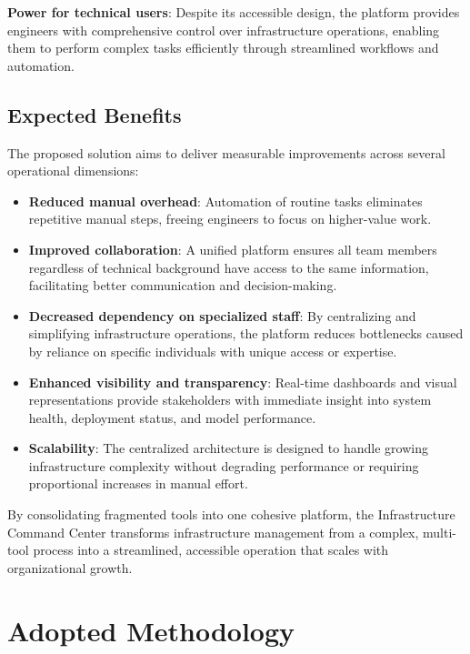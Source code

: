 \textbf{Power for technical users}: Despite its accessible design, the platform provides engineers with comprehensive control over infrastructure operations, enabling them to perform complex tasks efficiently through streamlined workflows and automation.

\subsection{Expected Benefits}

The proposed solution aims to deliver measurable improvements across several operational dimensions:

\begin{itemize}
    \item \textbf{Reduced manual overhead}: Automation of routine tasks eliminates repetitive manual steps, freeing engineers to focus on higher-value work.
    
    \item \textbf{Improved collaboration}: A unified platform ensures all team members regardless of technical background have access to the same information, facilitating better communication and decision-making.
    
    \item \textbf{Decreased dependency on specialized staff}: By centralizing and simplifying infrastructure operations, the platform reduces bottlenecks caused by reliance on specific individuals with unique access or expertise.
    
    \item \textbf{Enhanced visibility and transparency}: Real-time dashboards and visual representations provide stakeholders with immediate insight into system health, deployment status, and model performance.
    
    \item \textbf{Scalability}: The centralized architecture is designed to handle growing infrastructure complexity without degrading performance or requiring proportional increases in manual effort.
\end{itemize}

By consolidating fragmented tools into one cohesive platform, the Infrastructure Command Center transforms infrastructure management from a complex, multi-tool process into a streamlined, accessible operation that scales with organizational growth.
\newpage
\section{Adopted Methodology}

